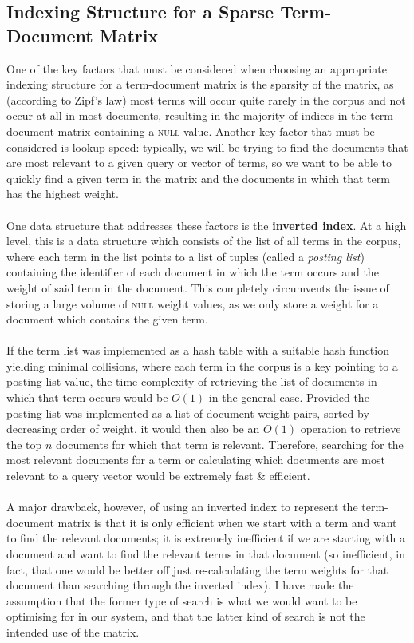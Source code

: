 \documentclass[a4paper]{article}
\begin{document}
\subsection{Indexing Structure for a Sparse Term-Document Matrix}
One of the key factors that must be considered when choosing an appropriate indexing structure for a term-document matrix is the sparsity of the matrix, as (according to Zipf's law) most terms will occur quite rarely in the corpus and not occur at all in most documents, resulting in the majority of indices in the term-document matrix containing a \textsc{null} value.
Another key factor that must be considered is lookup speed: typically, we will be trying to find the documents that are most relevant to a given query or vector of terms, so we want to be able to quickly find a given term in the matrix and the documents in which that term has the highest weight.
\\\\
One data structure that addresses these factors is the \textbf{inverted index}.
At a high level, this is a data structure which consists of the list of all terms in the corpus, where each term in the list points to a list of tuples (called a \textit{posting list}) containing the identifier of each document in which the term occurs and the weight of said term in the document.
This completely circumvents the issue of storing a large volume of \textsc{null} weight values, as we only store a weight for a document which contains the given term.
\\\\
If the term list was implemented as a hash table with a suitable hash function yielding minimal collisions, where each term in the corpus is a key pointing to a posting list value, the time complexity of retrieving the list of documents in which that term occurs would be $O(1)$ in the general case.
Provided the posting list was implemented as a list of document-weight pairs, sorted by decreasing order of weight, it would then also be an $O(1)$ operation to retrieve the top $n$ documents for which that term is relevant.
Therefore, searching for the most relevant documents for a term or calculating which documents are most relevant to a query vector would be extremely fast \& efficient. 
\\\\
A major drawback, however, of using an inverted index to represent the term-document matrix is that it is only efficient when we start with a term and want to find the relevant documents; it is extremely inefficient if we are starting with a document and want to find the relevant terms in that document (so inefficient, in fact, that one would be better off just re-calculating the term weights for that document than searching through the inverted index).
I have made the assumption that the former type of search is what we would want to be optimising for in our system, and that the latter kind of search is not the intended use of the matrix.
\end{document}
